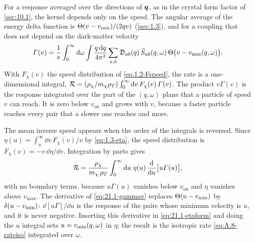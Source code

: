 For a response averaged over the directions of $\bm{q}$, as in the crystal form factor of \cref{sec:10.1}, the kernel depends only on the speed. The angular average of the energy delta function is $\Theta(v - v_{\mathrm{min}})/(2qv)$ (\cref{sec:1.3}), and for a coupling that does not depend on the dark-matter velocity
\begin{equation}
  \varGamma(v) = \frac{1}{v}\int_0^\infty\mathrm{d}\omega\int\frac{q\,\mathrm{d} q}{4\pi^2}\sum_{a,b}\mathfrak{D}_{ab}(q)\,\bar S_{ab}(q,\omega)\,\Theta\bigl(v - v_{\mathrm{min}}(q,\omega)\bigr) .
  \label{eq:21.1-gammav}
\end{equation}
With $F_\chi(v)$ the speed distribution of \cref{eq:1.2-Fspeed}, the rate is a one-dimensional integral, $\mathcal{R} = (\rho_\chi/m_{\chi}\rho_T)\int_0^\infty\mathrm{d} v\,F_\chi(v)\,\varGamma(v)$. The product $v\varGamma(v)$ is the response integrated over the part of the $(q,\omega)$ plane that a particle of speed $v$ can reach. It is zero below $v_{\mathrm{on}}$ and grows with $v$, because a faster particle reaches every pair that a slower one reaches and more.

The mean inverse speed appears when the order of the integrals is reversed. Since $\eta(u) = \int_u^\infty\dd v\,F_\chi(v)/v$ by \cref{eq:1.3-eta}, the speed distribution is $F_\chi(v) = -v\,\dd\eta/\dd v$. Integration by parts gives
\begin{equation}
  \mathcal{R} = \frac{\rho_\chi}{m_{\chi}\,\rho_T}\int_0^\infty\mathrm{d} u\;\eta(u)\,\frac{\mathrm{d}}{\mathrm{d} u}\bigl[u\varGamma(u)\bigr] ,
  \label{eq:21.1-etaform}
\end{equation}
with no boundary terms, because $u\varGamma(u)$ vanishes below $v_{\mathrm{on}}$ and $\eta$ vanishes above $v_{\mathrm{max}}$. The derivative of \cref{eq:21.1-gammav} replaces $\Theta(u - v_{\mathrm{min}})$ by $\delta(u - v_{\mathrm{min}})$: $\dd[u\varGamma]/\dd u$ is the response of the pairs whose minimum velocity is $u$, and it is never negative. Inserting this derivative in \cref{eq:21.1-etaform} and doing the $u$ integral sets $u = v_{\mathrm{min}}(q,\omega)$ in $\eta$; the result is the isotropic rate \cref{eq:A.8-rateiso} integrated over $\omega$.

